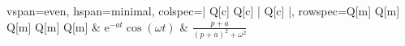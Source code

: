 \begin{tblr}{
        vspan=even, hspan=minimal,
        colspec={| Q[c] Q[c] | Q[c] |}, 
        rowspec={Q[m] Q[m] Q[m] Q[m] Q[m]}
    }
        & $ \mathrm{e}^{-at} \cos(\omega t)$ %
        & $\displaystyle \frac{p + a}{(p + a)^2 + \omega^2} $ 

        \\ \hline
    \end{tblr}